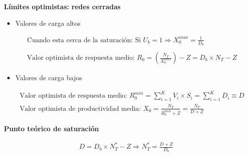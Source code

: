 \documentclass[a4paper,12pt]{article}
\begin{document}
\textbf{Límites optimistas: redes cerradas}
\begin{itemize}
    \item Valores de carga altos

\begin{tcolorbox}[colback=yellow!5!white, colframe=yellow!75!black]
    \begin{align*}
        \text{Cuando esta cerca de la saturación: } \text{Si } U_b = 1 \Rightarrow X_0^{max} = \frac{1}{D_b} \\ \\
        \text{Valor optimista de respuesta medio: } 
        R_0 = \left(\frac{N_T}{X_0^{max}}\right) - Z = D_b \times N_T - Z
    \end{align*}
\end{tcolorbox}

\item Valores de carga bajos
\begin{tcolorbox}[colback=yellow!5!white, colframe=yellow!75!black]
    \begin{align*}
        \text{Valor optimista de respuesta medio: } 
        R_0^{min} = \sum_{i=1}^{K} V_i \times S_i = \sum_{i=1}^{K} D_i \equiv D
        \\
        \text{Valor optimista de productividad media: }
        X_0 = \frac{N_T}{R_0^{min} + Z} = \frac{N_T}{D + Z} 
    \end{align*}
\end{tcolorbox}



\end{itemize}

\textbf{Punto teórico de saturación}
\begin{tcolorbox}[colback=yellow!5!white, colframe=yellow!75!black]
    \begin{align*}
        D = D_b \times N_T^* - Z \Rightarrow N_T^* = \frac{D + Z}{D_b}
    \end{align*}
\end{tcolorbox}
\end{document}
